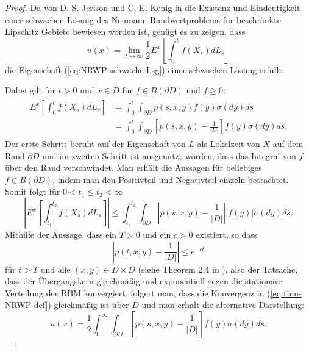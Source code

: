 \documentclass[10pt, a4paper, leqno, twoside, bibliography=totocnumbered, final]{scrartcl}
\theoremstyle{definition}
\theoremstyle{plain}%
\theoremstyle{remark}
\begin{document}
\begin{proof}

Da von D. S. Jerison und C. E. Kenig in \cite{Jerison-Kenig} die Existenz und Eindeutigkeit einer schwachen Lösung des Neumann-Randwertproblems für beschränkte Lipschitz Gebiete bewiesen worden ist, genügt es zu zeigen, dass 
\begin{equation*}
u(x) = \lim_{t \to \infty} \frac{1}{2} E^x \left[ \int_0^t f(X_s) dL_s \right]
\end{equation*}
die Eigenschaft (\ref{eq:NRWP-schwache-Lsg}) einer schwachen Lösung erfüllt.

Dabei gilt für $ t >0 $ und $ x \in D $ für $ f \in B( \partial D ) $ und $ f \geq 0 $:
\begin{align}
\begin{split}
E^x \left[ \int_0^t f(X_s) dL_s  \right] & = \int_0^t \int_{\partial D} p(s,x,y) f(y) \sigma(dy) ds \\
& = \int_0^t \int_{\partial D} \left[ p(s,x,y) -\frac{1}{|D|} \right] f(y) \sigma(dy) ds.
\end{split}
\end{align}
Der erste Schritt beruht auf der Eigenschaft von $ L $ als Lokalzeit von $ X $ auf dem Rand $ \partial D $ und im zweiten Schritt ist ausgenutzt worden, dass das Integral von $ f $ über den Rand verschwindet. Man erhält die Aussagen für beliebiges $ f \in B( \partial D ) $, indem man den Positivteil und Negativteil einzeln betrachtet. Somit folgt für $ 0 < t_1 \leq t_2 < \infty $
\begin{equation*}
\left| E^x \left[ \int_{t_1}^{t_2} f(X_s) dL_s  \right] \right| \leq \int_{t_1}^{t_2} \int_{\partial D} \left| p(s,x,y) -\frac{1}{|D|} \right| |f(y)| \sigma(dy) ds.
\end{equation*}
Mithilfe der Aussage, dass ein $ T > 0 $ und ein $ c>0 $ existiert, so dass 
\begin{equation}
\label{eq:Thm-NRWP-stationäre-Verteilung}
 \left| p(t,x,y) -\frac{1}{|D|} \right| \leq e^{-ct} 
\end{equation} 
für $ t > T  $ und alle $ (x,y) \in \overline{D} \times \overline{D} $ (siehe Theorem 2.4 in \cite{Fukushima}), also der Tatsache, dass der Übergangskern gleichmäßig und exponentiell gegen die stationäre Verteilung der RBM konvergiert, folgert man, dass die Konvergenz in (\ref{eq:thm-NRWP-def}) gleichmäßig ist über $ \overline{D} $ und man erhält die alternative Darstellung:
\begin{equation}
\label{eq:Thm-NRWP-glm-Konvergenz}
u (x) = \frac{1}{2} \int_0^{\infty} \int_{\partial D} \left[ p(s,x,y) -\frac{1}{|D|} \right] f(y) \sigma(dy) ds.
\end{equation}


\end{proof}
\end{document}
